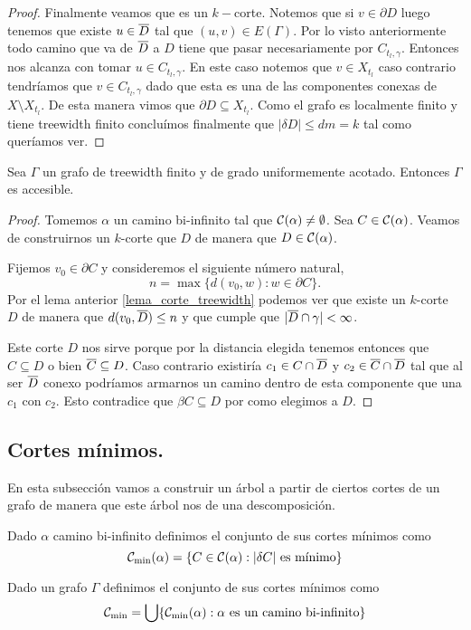 \documentclass[tesis.tex]{subfiles}
\begin{document}
\begin{proof}
	Finalmente veamos que es un $k-$corte.
	Notemos que si $v \in \partial D$ luego tenemos que existe $u \in \overline D$ tal que $(u,v) \in E(\Gamma)$.
	Por lo visto anteriormente todo camino que va de $\overline D$ a $D$ tiene que pasar necesariamente por $C_{t_l, \gamma}$. 
	Entonces nos alcanza con tomar $u \in C_{t_l, \gamma}$.
	En este caso notemos que $v \in X_{t_l}$ caso contrario tendríamos que $v \in C_{t_l, \gamma}$ dado que esta es una de las componentes conexas de $X \setminus X_{t_l}$.
	De esta manera vimos que $\partial D \subseteq X_{t_l}$.
	Como el grafo es localmente finito y tiene treewidth finito concluímos finalmente que $|\delta D| \le dm = k$ tal como queríamos ver.
		
\end{proof}


\begin{teo}\label{teo_treewidth_fin_accesible}
	Sea $\Gamma$ un grafo de treewidth finito y de grado uniformemente acotado.
	Entonces $\Gamma$ es accesible.
\end{teo}
\begin{proof}
	Tomemos $\alpha$ un camino bi-infinito tal que ${\cal C}(\alpha) \neq \emptyset$.
	Sea $C \in {\cal C}(\alpha)$.
	Veamos de construirnos un $k$-corte que $D$ de manera que $D \in {\cal C}(\alpha)$.
	
	Fijemos $v_0  \in \partial C$ y consideremos el siguiente número natural,
	\[
		n = \max \{ d(v_0,w) : w \in \partial C  \}.
	\]
	Por el lema anterior \ref{lema_corte_treewidth} podemos ver que existe un $k$-corte $D$ de manera que $d(v_0, \overline D) \le n$ y que cumple que $|\overline D \cap \gamma| < \infty$.
	
	Este corte $D$ nos sirve porque por la distancia elegida tenemos entonces que $C \subseteq D$ o bien $\overline C \subseteq D$.
	Caso contrario existiría $c_1 \in C \cap \overline D$ y $c_2 \in \overline C \cap \overline D$ tal que al ser $\overline D$ conexo podríamos armarnos un camino dentro de esta componente que una $c_1$ con $c_2$.
	Esto contradice que $\beta C \subseteq D$ por como elegimos a $D$.	
\end{proof}


\subsection{Cortes mínimos.}
En esta subsección vamos a construir un árbol a partir de ciertos cortes de un grafo de manera que este árbol nos de una descomposición.

\begin{deff}
	Dado $\alpha$ camino bi-infinito definimos el conjunto de sus cortes mínimos como
	\[
		\cam = \{  C \in \ca : |\delta C| \ \text{es mínimo}  \}
	\]
	
	Dado un grafo $\Gamma$ definimos el conjunto de sus cortes mínimos como 
	\[
		{\cal C}_{\text{min}} = \bigcup \{ {\cal C}_{\text{min}}(\alpha) : \alpha \ \text{es un camino bi-infinito}  \}
	\]
\end{deff}
\end{document}
